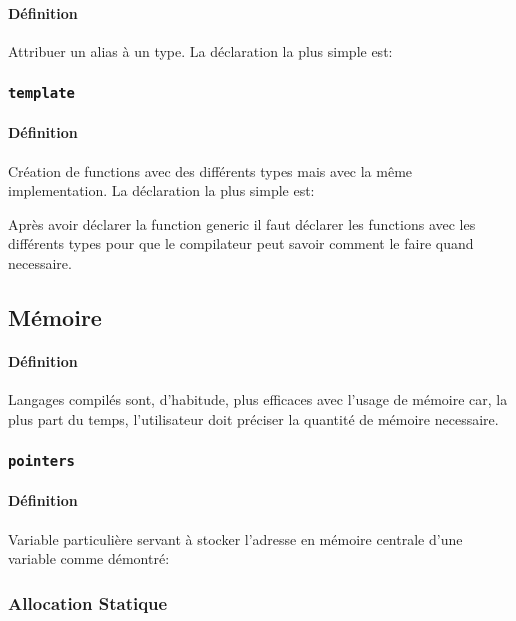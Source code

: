 \documentclass{article}
\begin{document}
\paragraph{Définition}Attribuer un alias à un type. La déclaration la plus simple est:
\begin{scriptsize}
    \mycode
\end{scriptsize}

\subsubsection{\texttt{template}}
\paragraph{Définition}Création de functions avec des différents types mais avec la même implementation. La déclaration la plus simple est:
\begin{scriptsize}
    \mycode
\end{scriptsize}
Après avoir déclarer la function generic il faut déclarer les functions avec les différents types pour que le compilateur peut savoir comment le faire quand necessaire.

\subsection{Mémoire}
\paragraph{Définition}Langages compilés sont, d'habitude, plus efficaces avec l'usage de mémoire car, la plus part du temps, l'utilisateur doit préciser la quantité de mémoire necessaire.
\subsubsection{\texttt{pointers}}
\paragraph{Définition}Variable particulière servant à stocker l'adresse en mémoire centrale d'une variable comme démontré:
\begin{scriptsize}
    \mycode
\end{scriptsize}

\subsubsection{Allocation Statique}
\end{document}
